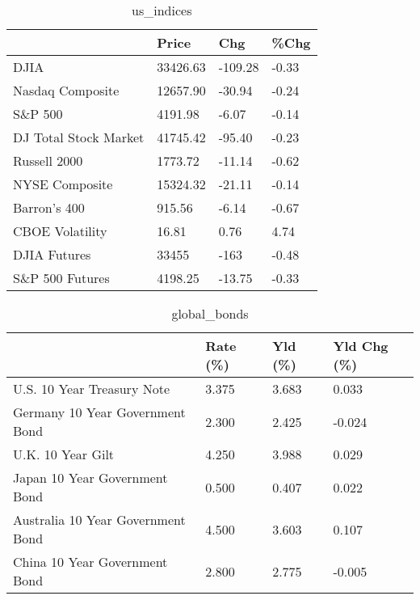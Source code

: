 \documentclass{article}%
\begin{document}
%


\begin{table}[htbp]%
\caption{us\_indices}%
\centering%
\begin{adjustbox}{width=1\textwidth}%
\begin{tabular}{llll}
\toprule
                      &    Price &     Chg &  \%Chg \\
\midrule
                 DJIA & 33426.63 & -109.28 & -0.33 \\
     Nasdaq Composite & 12657.90 &  -30.94 & -0.24 \\
              S\&P 500 &  4191.98 &   -6.07 & -0.14 \\
DJ Total Stock Market & 41745.42 &  -95.40 & -0.23 \\
         Russell 2000 &  1773.72 &  -11.14 & -0.62 \\
       NYSE Composite & 15324.32 &  -21.11 & -0.14 \\
         Barron's 400 &   915.56 &   -6.14 & -0.67 \\
      CBOE Volatility &    16.81 &    0.76 &  4.74 \\
         DJIA Futures &    33455 &    -163 & -0.48 \\
      S\&P 500 Futures &  4198.25 &  -13.75 & -0.33 \\
\bottomrule
\end{tabular}
%
\end{adjustbox}%
\end{table}

%


\begin{table}[htbp]%
\caption{global\_bonds}%
\centering%
\begin{adjustbox}{width=1\textwidth}%
\begin{tabular}{llll}
\toprule
                                  & Rate (\%) & Yld (\%) & Yld Chg (\%) \\
\midrule
       U.S. 10 Year Treasury Note &    3.375 &   3.683 &       0.033 \\
  Germany 10 Year Government Bond &    2.300 &   2.425 &      -0.024 \\
                U.K. 10 Year Gilt &    4.250 &   3.988 &       0.029 \\
    Japan 10 Year Government Bond &    0.500 &   0.407 &       0.022 \\
Australia 10 Year Government Bond &    4.500 &   3.603 &       0.107 \\
    China 10 Year Government Bond &    2.800 &   2.775 &      -0.005 \\
\bottomrule
\end{tabular}
%
\end{adjustbox}%
\end{table}
\end{document}
